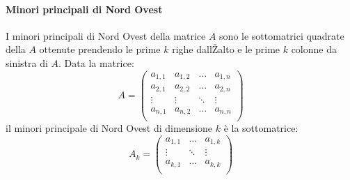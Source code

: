 \documentclass[a4paper,12pt]{book}
\begin{document}
\paragraph{Minori principali di Nord Ovest}
I minori principali di Nord Ovest della matrice $A$ sono le sottomatrici quadrate della $A$ ottenute prendendo le prime $k$ righe dallŽalto e le prime $k$ colonne da sinistra di $A$.
Data la matrice:
\begin{displaymath}
A=\left(\begin{array}{cccc}
a_{1,1} & a_{1,2} & \dots &a_{1,n} \\

a_{2,1} & a_{2,2} & \dots &a_{2,n} \\

\vdots & \vdots & \ddots & \vdots \\

a_{n,1} & a_{n,2} & \dots &a_{n,n} \\
\end{array}\right)
\end{displaymath}
il minori principale di Nord Ovest di dimensione $k$ è la sottomatrice:
\begin{displaymath}
A_k=\left(\begin{array}{ccc}
a_{1,1} &  \dots &a_{1,k} \\


\vdots & \ddots & \vdots \\

a_{k,1} & \dots &a_{k,k} \\
\end{array}\right)
\end{displaymath}
\end{document}
